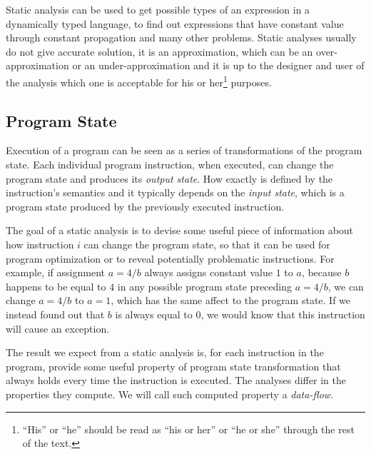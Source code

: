         Static analysis can be used to get possible types of an expression in 
        a dynamically typed language, to find out expressions that have constant 
        value through constant propagation and many other problems. 
        Static analyses usually do not give accurate solution, it is an approximation, 
        which can be an over-approximation or an under-approximation and it is up 
        to the designer and user of the analysis which one is acceptable for 
        his or her\footnote{``His'' or ``he'' 
        should be read as ``his or her'' or ``he or she'' through the rest of the text.} 
        purposes.
        
        \subsection{Program State}
        Execution of a program can be seen as a series of transformations of 
        the program state. Each individual program instruction, when executed, 
        can change the program state and produces its \emph{output state}.         
        How exactly is defined by the instruction's semantics and it typically 
        depends on the \emph{input state}, which is a program state produced 
        by the previously executed instruction. 
        
        The goal of a static analysis is to devise some useful piece of information 
        about how instruction $i$ can change the program state, so that it can 
        be used for program optimization or to reveal potentially problematic 
        instructions. For example, if assignment $a=4/b$ always assigns 
        constant value $1$ to $a$, because $b$ happens to be equal to $4$ 
        in any possible program state preceding $a=4/b$, we can change 
        $a=4/b$ to $a=1$, which has the same affect to the program state. 
        If we instead found out that $b$ is always equal to $0$, we would 
        know that this instruction will cause an exception.
        
        The result we expect from a static analysis is, for each instruction 
        in the program, provide some useful property of program state transformation 
        that always holds every time the instruction is executed. 
        The analyses differ in the properties they compute. 
        We will call such computed property a \emph{data-flow}.
        
